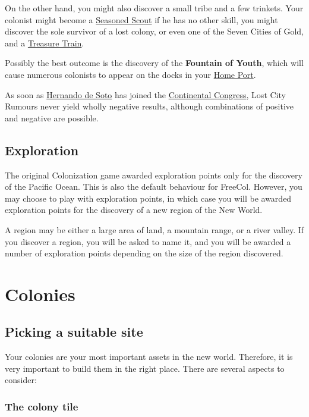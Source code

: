 \documentclass[12pt]{book}
\newcommand{\Concept}[1]{\index{#1}\hypertarget{#1}{\textbf{#1}}}
\begin{document}
On the other hand, you might also discover a small tribe and a few
trinkets. Your colonist might become a \hyperlink{Seasoned
  Scout}{Seasoned Scout} if he has no other skill, you might discover
the sole survivor of a lost colony, or even one of the Seven Cities of
Gold, and a \hyperlink{Treasure Train}{Treasure Train}.

Possibly the best outcome is the discovery of the \Concept{Fountain of
Youth}, which will cause numerous colonists to appear on the docks in
your \hyperlink{Home Port}{Home Port}.

As soon as \hyperlink{Hernando de Soto}{Hernando de Soto} has joined
the \hyperlink{Continental Congress}{Continental Congress}, Lost City
Rumours never yield wholly negative results, although combinations of
positive and negative are possible.


\hypertarget{Exploration}{\section{Exploration}}

The original Colonization game awarded exploration points only for the
discovery of the Pacific Ocean. This is also the default behaviour for
FreeCol. However, you may choose to play with exploration points, in
which case you will be awarded exploration points for the discovery of
a new region of the New World.

A region may be either a large area of land, a mountain range, or a
river valley. If you discover a region, you will be asked to name it,
and you will be awarded a number of exploration points depending on
the size of the region discovered.


\hypertarget{Colonies}{\chapter{Colonies}}

\hypertarget{Picking a suitable site}{\section{Picking a suitable site}}

Your colonies are your most important assets in the new world.
Therefore, it is very important to build them in the right
place. There are several aspects to consider:

\hypertarget{The colony tile}{\subsection{The colony tile}}
\end{document}
